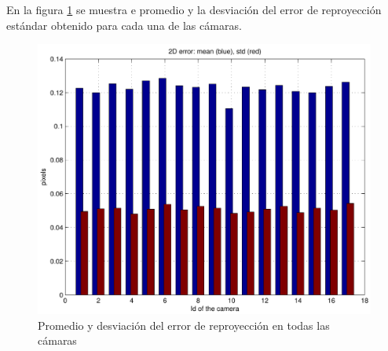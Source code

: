 En la figura \ref{fig: error reproyeccion} se muestra e promedio y la desviación del error de reproyección estándar obtenido para cada una de las cámaras.

\begin{figure}[ht]
\begin{center}
\includegraphics[scale=0.4]{img/calibracion/reprerrors.pdf}
\end{center}

\caption{Promedio y desviación  del error de reproyección en todas las cámaras }
\label{fig: error reproyeccion}
\end{figure}
  







